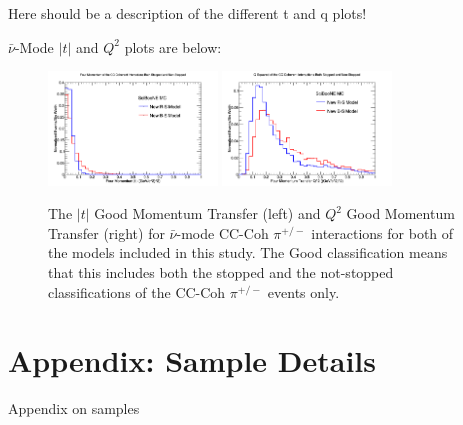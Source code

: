 \documentclass[11pt]{article}
\begin{document}
Here should be a description of the different t and q plots!

$\bar{\nu}$-Mode $|t|$ and $Q^2$ plots are below:

\begin{figure}[H]
\centering
\includegraphics[width=0.4\textwidth]{CCCohPlots/ANMCCCohGoodT.png}
\includegraphics[width=0.4\textwidth]{CCCohPlots/ANMCCCohGoodQ2.png}
\caption{The $|t|$ Good Momentum Transfer (left) and $Q^2$ Good Momentum Transfer (right) for $\bar{\nu}$-mode CC-Coh $\pi^{+/-}$ interactions for both of the models included in this study. The Good classification means that this includes both the stopped and the not-stopped classifications of the CC-Coh $\pi^{+/-}$ events only.}
\end{figure}\label{fig:AntiNuModeCCCohGoodTAndQ2}


%
\newpage

\appendix


\section{Appendix: Sample Details}\label{sec:SampleAppendix}

Appendix on samples

\end{document}
